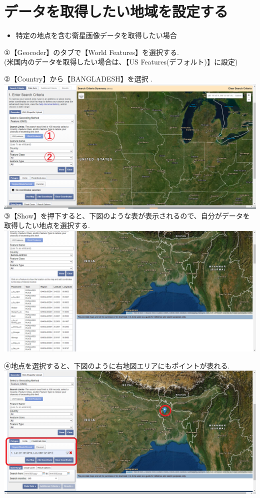 \documentclass[
]{book}
\providecommand{\tightlist}{%
  \setlength{\itemsep}{0pt}\setlength{\parskip}{0pt}}
\begin{document}
\hypertarget{ux30c7ux30fcux30bfux3092ux53d6ux5f97ux3057ux305fux3044ux5730ux57dfux3092ux8a2dux5b9aux3059ux308b}{%
\section{データを取得したい地域を設定する}\label{ux30c7ux30fcux30bfux3092ux53d6ux5f97ux3057ux305fux3044ux5730ux57dfux3092ux8a2dux5b9aux3059ux308b}}

\begin{itemize}
\tightlist
\item
  特定の地点を含む衛星画像データを取得したい場合
\end{itemize}

①【Geocoder】のタブで【World Features】を選択する.\\
(米国内のデータを取得したい場合は、【US Features(デフォルト)】に設定)

②【Country】から【BANGLADESH】を選択 .\\
\includegraphics{images/area1.png}
③【Show】を押下すると、下図のような表が表示されるので、自分がデータを取得したい地点を選択する.
\includegraphics{images/table1.png}

④地点を選択すると、下図のように右地図エリアにもポイントが表れる.
\includegraphics{images/showarea.png}
\end{document}
